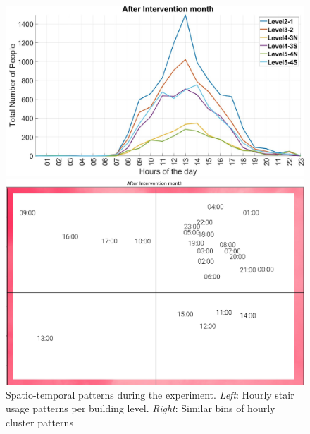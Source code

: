 \begin{figure}[htb]
    \begin{minipage}[b]{0.5\textwidth}
    \includegraphics[width=\textwidth]{image/after_int.jpg}%
    \end{minipage}
    \begin{minipage}[b]{0.39\textwidth}
    \includegraphics[width=\textwidth]{image/Chapters/Chapter6/timeseriesafter.png}
    \end{minipage}
    
    \caption{Spatio-temporal patterns during the experiment. \textit{Left}: Hourly stair usage patterns per building level. \textit{Right}: Similar bins of hourly cluster patterns}
    \label{spa1}
\end{figure}



